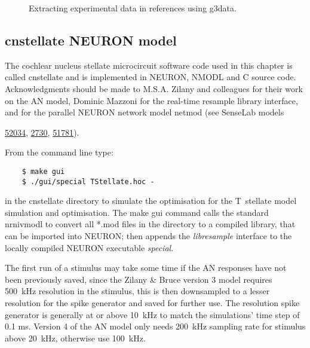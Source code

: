 


\begin{figure}[htb]
  \begin{center}
    \caption{Extracting experimental data in references using g3data.}
    \label{fig:Extractdata}
  \end{center}
\end{figure}


\subsection{\textsf{cnstellate} NEURON model    \label{sec:cnstellate-neur-model}}

The cochlear nucleus stellate microcircuit software code used in this chapter is
called \textsf{cnstellate} and is implemented in NEURON, NMODL and C source
code.  Acknowledgments should be made to M.S.A. Zilany and colleagues for their
work on the AN model, Dominic Mazzoni for the real-time resample library
interface, and \citet{MiglioreCanniaEtAl:2006} for the parallel NEURON network
model \textsf{netmod} (see SenseLab models


\href{http://senselab.med.yale.edu/senselab/modeldb/ShowModel.asp?model=52034}{52034},
\href{http://senselab.med.yale.edu/senselab/modeldb/ShowModel.asp?model=2730}{2730},
\href{http://senselab.med.yale.edu/senselab/modeldb/ShowModel.asp?model=51781}{51781}).



From the command line type:
\begin{verbatim}
    $ make gui
    $ ./gui/special TStellate.hoc -
\end{verbatim}
\noindent in the \textsf{cnstellate} directory to simulate the optimisation for the T~stellate model simulation and optimisation.
The \textsf{make gui} command calls the standard \textsf{nrnivmodl} to convert all *.mod files in the directory to a compiled library, that can be imported into NEURON; then appends the \textit{libresample} interface to the locally compiled NEURON executable \textit{special}.

The first run of a stimulus may take some time if the AN responses have not been previously saved, since the Zilany \& Bruce version 3 model requires 500~kHz resolution in the stimulus, this is then downsampled to a lesser resolution for the spike generator and saved for further use.
The resolution spike generator is generally at or above 10~kHz to match the simulations' time step of 0.1 ms.  Version 4 of the AN model \citep{ZilanyBruceEtAl:2009} only needs 200~kHz sampling rate for stimulus above 20~kHz, otherwise use 100~kHz.



